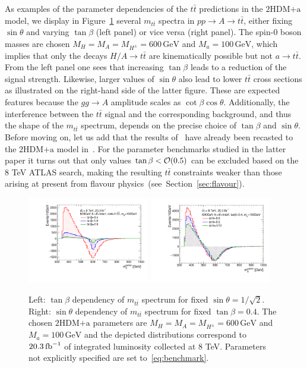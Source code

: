 \documentclass[review]{elsarticle}
\newcommand{\mA}{\ensuremath{M_{A}}\xspace}
\newcommand{\ma}{\ensuremath{M_{a}}\xspace}
\newcommand{\mH}{\ensuremath{M_{H}}\xspace}
\newcommand{\mHc}{\ensuremath{M_{H^{\pm}}}\xspace}
\newcommand{\hdma}{\ensuremath{\textrm{2HDM+a}}\xspace}
\begin{document}
As examples of the parameter dependencies of the $t \bar t$ predictions in the \hdma model, we display in  Figure~\ref{fig:ttres_2HDM_A} several $m_{t \bar t}$ spectra in $pp \to A \to t \bar t$, either fixing $\sin \theta$ and varying $\tan \beta$ (left panel) or vice versa (right panel). The  spin-0 boson  masses are chosen $\mH=\mA=\mHc =600 \, {\mathrm{GeV}}$ and $\ma=100 \, {\mathrm{GeV}}$, which implies that only the  decays $H/A \to t \bar t$  are kinematically possible but not $a \to t \bar t$.  From the left panel one sees that increasing $\tan \beta$ leads  to a reduction of the signal strength.  Likewise, larger values of $\sin \theta$ also lead to lower $t \bar t$ cross sections as illustrated on the right-hand side of the latter figure. These are expected features because the $g g \to A$ amplitude  scales as $\cot \beta \cos \theta$.  Additionally, the interference between the $t \bar t$ signal and the corresponding background, and thus the shape of the $m_{t \bar t}$ spectrum, depends on the precise choice of $\tan \beta$  and $\sin \theta$.  Before moving on, let us add that the results of~\cite{Aaboud:2017hnm} have already been recasted to the \hdma model in~\cite{Bauer:2017ota}. For the parameter benchmarks studied in the latter paper it turns out that only values $\tan \beta < {\cal O} ( 0.5)$ can be excluded based on the 8 TeV ATLAS search, making the resulting $t \bar t$ constraints weaker than those arising at present from flavour physics~(see~Section~\ref{sec:flavour}). 

\begin{figure}
\centering
\includegraphics[width=0.475\textwidth]{ttres_2HDMa_A_tanb.pdf} \quad 
\includegraphics[width=0.475\textwidth]{ttres_2HDMa_A_sinp.pdf}
\vspace{4mm}
\caption{Left: $\tan \beta$ dependency of $m_{t \bar t}$ spectrum for fixed $\sin \theta = 1/\sqrt{2}$. Right:  $\sin \theta$ dependency of $m_{t \bar t}$ spectrum for fixed $\tan \beta = 0.4$. The chosen \hdma parameters are $\mH=\mA=\mHc =600 \, {\mathrm{GeV}}$ and $\ma=100 \, {\mathrm{GeV}}$ and the depicted distributions correspond to $20.3 \, {\rm fb}^{-1}$ of integrated luminosity collected at 8 TeV. Parameters not explicitly specified are set to~\eqref{eq:benchmark}.}
\label{fig:ttres_2HDM_A}
\end{figure}
\end{document}
